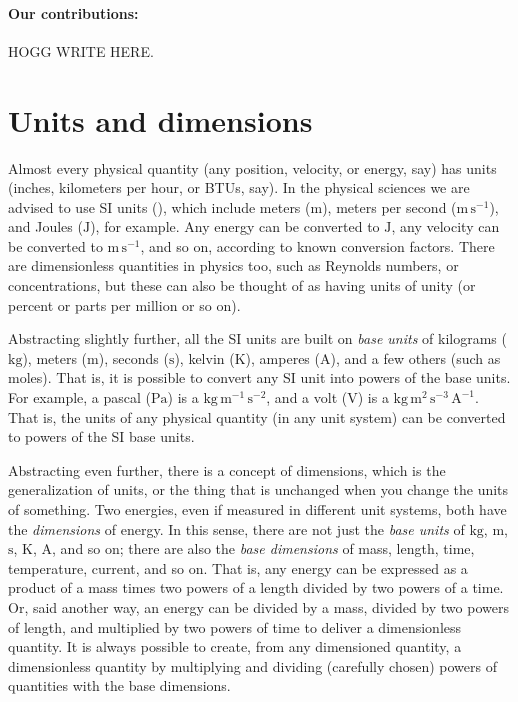 \documentclass{article}
\newcommand{\unit}[1]{\mathrm{#1}}
\newcommand{\kg}{\unit{kg}}
\newcommand{\m}{\unit{m}}
\newcommand{\s}{\unit{s}}
\newcommand{\K}{\unit{K}}
\newcommand{\A}{\unit{A}}
\newcommand{\J}{\unit{J}}
\newcommand{\Pa}{\unit{Pa}}
\newcommand{\V}{\unit{V}}
\begin{document}
\paragraph{Our contributions:}
HOGG WRITE HERE.

\section{Units and dimensions}

Almost every physical quantity (any position, velocity, or energy, say) has units (inches, kilometers per hour, or BTUs, say).
In the physical sciences we are advised to use SI units (\cite{si}), which include meters ($\m$), meters per second ($\m\,\s^{-1}$), and Joules ($\J$), for example.
Any energy can be converted to $\J$, any velocity can be converted to $\m\,\s^{-1}$, and so on, according to known conversion factors.
There are dimensionless quantities in physics too, such as Reynolds numbers, or concentrations, but these can also be thought of as having units of unity (or percent or parts per million or so on).

Abstracting slightly further, all the SI units are built on \emph{base units} of kilograms ($\kg$), meters ($\m$), seconds ($\s$), kelvin ($\K$), amperes ($\A$), and a few others (such as moles).
That is, it is possible to convert any SI unit into powers of the base units.
For example, a pascal ($\Pa$) is a $\kg\,\m^{-1}\,\s^{-2}$, and a volt ($\V$) is a $\kg\,\m^{2}\,\s^{-3}\,\A^{-1}$.
That is, the units of any physical quantity (in any unit system) can be converted to powers of the SI base units.

Abstracting even further, there is a concept of dimensions, which is the generalization of units, or the thing that is unchanged when you change the units of something.
Two energies, even if measured in different unit systems, both have the \emph{dimensions} of energy.
In this sense, there are not just the \emph{base units} of $\kg$, $\m$, $\s$, $\K$, $\A$, and so on; there are also the \emph{base dimensions} of mass, length, time, temperature, current, and so on.
That is, any energy can be expressed as a product of a mass times two powers of a length divided by two powers of a time.
Or, said another way, an energy can be divided by a mass, divided by two powers of length, and multiplied by two powers of time to deliver a dimensionless quantity.
It is always possible to create, from any dimensioned quantity, a dimensionless quantity by multiplying and dividing (carefully chosen) powers of quantities with the base dimensions.
\end{document}
